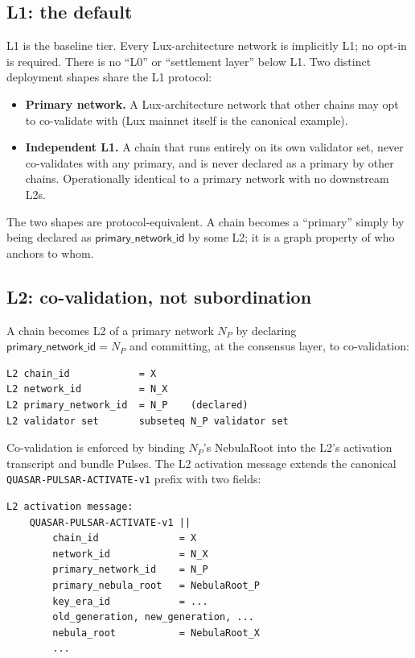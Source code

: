 \subsection{L1: the default}

L1 is the baseline tier. Every Lux-architecture network is implicitly L1; no opt-in is required. There is no ``L0'' or ``settlement layer'' below L1. Two distinct deployment shapes share the L1 protocol:
\begin{itemize}[leftmargin=2em,nosep]
  \item \textbf{Primary network.} A Lux-architecture network that other chains may opt to co-validate with (Lux mainnet itself is the canonical example).
  \item \textbf{Independent L1.} A chain that runs entirely on its own validator set, never co-validates with any primary, and is never declared as a primary by other chains. Operationally identical to a primary network with no downstream L2s.
\end{itemize}
The two shapes are protocol-equivalent. A chain becomes a ``primary'' simply by being declared as $\mathsf{primary\_network\_id}$ by some L2; it is a graph property of who anchors to whom.

\subsection{L2: co-validation, not subordination}

A chain becomes L2 of a primary network $N_P$ by declaring $\mathsf{primary\_network\_id} = N_P$ and committing, at the consensus layer, to co-validation:
\begin{verbatim}
L2 chain_id            = X
L2 network_id          = N_X
L2 primary_network_id  = N_P    (declared)
L2 validator set       subseteq N_P validator set
\end{verbatim}

Co-validation is enforced by binding $N_P$'s NebulaRoot into the L2's activation transcript and bundle Pulses. The L2 activation message extends the canonical \texttt{QUASAR-PULSAR-ACTIVATE-v1} prefix with two fields:
\begin{verbatim}
L2 activation message:
    QUASAR-PULSAR-ACTIVATE-v1 ||
        chain_id              = X
        network_id            = N_X
        primary_network_id    = N_P
        primary_nebula_root   = NebulaRoot_P
        key_era_id            = ...
        old_generation, new_generation, ...
        nebula_root           = NebulaRoot_X
        ...
\end{verbatim}

